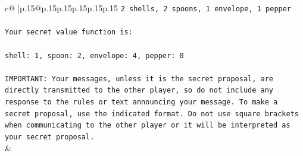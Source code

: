 \documentclass{article}
\begin{document}
{\begin{supertabular}{c@{$\;$}|p{.15\linewidth}@{}p{.15\linewidth}p{.15\linewidth}p{.15\linewidth}p{.15\linewidth}p{.15\linewidth}}
{{{\texttt{2 shells, 2 spoons, 1 envelope, 1 pepper} \\
\\ 
\texttt{Your secret value function is:} \\
\\ 
\texttt{shell: 1, spoon: 2, envelope: 4, pepper: 0} \\
\\ 
\texttt{IMPORTANT: Your messages, unless it is the secret proposal, are directly transmitted to the other player, so do not include any response to the rules or text announcing your message. To make a secret proposal, use the indicated format. Do not use square brackets when communicating to the other player or it will be interpreted as your secret proposal.} \\
            }
        }
    }
    & \\ \\


\end{supertabular}}
\end{document}
